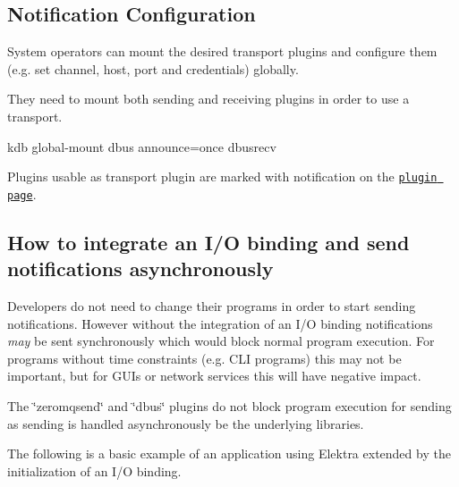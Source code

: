 \subsection*{Notification Configuration}

System operators can mount the desired transport plugins and configure them (e.\+g. set channel, host, port and credentials) globally.

They need to mount both sending and receiving plugins in order to use a transport.


\begin{DoxyCode}
kdb global-mount dbus announce=once dbusrecv
\end{DoxyCode}


Plugins usable as transport plugin are marked with {\ttfamily notification} on the \href{https://www.libelektra.org/plugins/readme#notification-and-logging}{\tt plugin page}.

\subsection*{How to integrate an I/O binding and send notifications asynchronously}

Developers do not need to change their programs in order to start sending notifications. However without the integration of an I/O binding notifications {\itshape may} be sent synchronously which would block normal program execution. For programs without time constraints (e.\+g. C\+LI programs) this may not be important, but for G\+U\+Is or network services this will have negative impact.

The \char`\"{}zeromqsend\char`\"{} and \char`\"{}dbus\char`\"{} plugins do not block program execution for sending as sending is handled asynchronously be the underlying libraries.

The following is a basic example of an application using Elektra extended by the initialization of an I/O binding.


